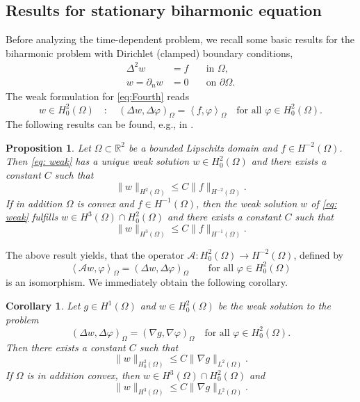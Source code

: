 \documentclass{m2an}
\newcommand{\1}{\mathds{1}}
\newcommand{\Om}{\Omega}
\renewcommand{\textforall}{\text{for all }}
\newcommand{\na}{\nabla}
\newcommand{\Oprod}[1]{\left(#1\right)_{\Omega}}
\newcommand{\Opair}[1]{\left\langle#1\right\rangle_{\Omega}}
\newtheorem{proposition}[theorem]{Proposition}
\newtheorem{corollary}[theorem]{Corollary}
\theoremstyle{definition}
\begin{document}
\subsection{Results for stationary biharmonic equation}

Before analyzing the time-dependent problem, we recall some basic results for the biharmonic problem with Dirichlet (clamped) boundary conditions,
\begin{equation}\label{eq:Fourth}
    \begin{aligned}
	\Delta^2 w &= f \quad &\text{in }\Omega, \\
	w=\partial_n w &=  0 \quad  &\text{on } \partial \Omega.
	    \end{aligned}
\end{equation}
The weak formulation for \eqref{eq:Fourth} reads
\begin{equation}\label{eq: weak}
w\in H^2_0(\Om) \quad : \quad	\Oprod{\Delta w, \Delta \varphi} 
= \Opair{f, \varphi} \quad \textforall \varphi\in H^2_0(\Om).
\end{equation}
The following results can be found, e.g., in \cite[Sec. 5.9]{Kondratev_1967}.
\begin{proposition}\label{prop: elliptic}
Let $\Om\subset \mathbb{R}^2$ be a bounded Lipschitz domain and $f\in H^{-2}(\Om)$.
Then \eqref{eq: weak} has a unique weak solution $w\in H^2_0(\Om)$ and there exists a constant $C$ such that 
\begin{equation}\label{eq: H2 regularity}
\|w\|_{H^{2}(\Om)}\le C\|f\|_{H^{-2}(\Om)}.
\end{equation}
If in addition $\Om$ is convex and $f\in H^{-1}(\Om)$, then the weak solution $w$ of  \eqref{eq: weak} fulfills $w\in H^3(\Om)\cap H^2_0(\Om)$ and there exists a constant $C$ such that 
\begin{equation}\label{eq: H3 regularity}
\|w\|_{H^{3}(\Om)}\le C\|f\|_{H^{-1}(\Om)}.
\end{equation}
\end{proposition}
The above result yields, that the operator $\mathcal A\colon H^2_0(\Om) \to H^{-2}(\Om)$, defined by 
    \begin{equation}\label{eq:def_biharmonic_operator}
        \Opair{\mathcal A w,\varphi} = \Oprod{\Delta w, \Delta \varphi} \qquad \textforall \varphi \in H^2_0(\Om)
    \end{equation}
    is an isomorphism.
We immediately obtain the following corollary.
\begin{corollary}\label{cor:biharmonic}
Let $g \in H^1(\Omega)$ and $w \in H^2_0(\Omega)$ be the weak solution to the problem 
\begin{equation}\label{eq:Fourth weak}
	\Oprod{\Delta w, \Delta \varphi} = \Oprod{\na g,\na \varphi} \quad \textforall \varphi\in H^2_0(\Om).
	\end{equation}
	Then there exists a constant $C$  such that
	\[
	\|w\|_{H^2_0(\Omega)} \le C \|\na g\|_{L^2(\Om)}.
	\]
  If $\Omega$ is in addition convex, then $w \in H^3(\Omega)\cap H^2_0(\Omega)$ and
\begin{equation}\label{eq: H3 regularity 2}
\|w\|_{H^{3}(\Om)}\le C\|\na g\|_{L^2(\Om)}.
\end{equation}	
\end{corollary}
\end{document}
